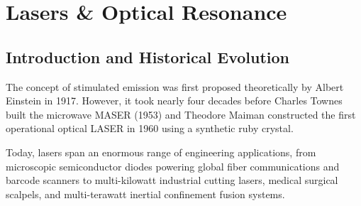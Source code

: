 \chapter{Lasers \& Optical Resonance}

\section{Introduction and Historical Evolution}
The concept of stimulated emission was first proposed theoretically by Albert Einstein in 1917. However, it took nearly four decades before Charles Townes built the microwave MASER (1953) and Theodore Maiman constructed the first operational optical LASER in 1960 using a synthetic ruby crystal. 

Today, lasers span an enormous range of engineering applications, from microscopic semiconductor diodes powering global fiber communications and barcode scanners to multi-kilowatt industrial cutting lasers, medical surgical scalpels, and multi-terawatt inertial confinement fusion systems.

